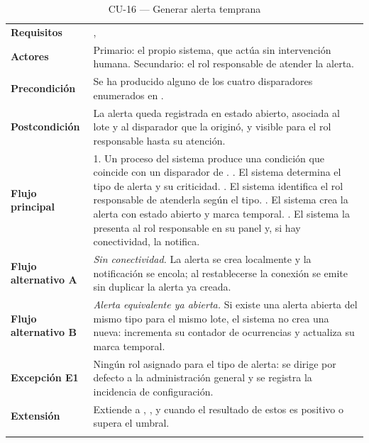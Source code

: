 \begin{longtable}{|L{3.4cm}|L{12.0cm}|}
\hline
{}\\
\hline
\textbf{Requisitos} & ,  \\ \hline
\textbf{Actores} & Primario: el propio sistema, que actúa sin intervención humana. Secundario: el rol responsable de atender la alerta. \\ \hline
\textbf{Precondición} & Se ha producido alguno de los cuatro disparadores enumerados en . \\ \hline
\textbf{Postcondición} & La alerta queda registrada en estado abierto, asociada al lote y al disparador que la originó, y visible para el rol responsable hasta su atención. \\ \hline
\textbf{Flujo principal} & 1. Un proceso del sistema produce una condición que coincide con un disparador de . . El sistema determina el tipo de alerta y su criticidad. . El sistema identifica el rol responsable de atenderla según el tipo. . El sistema crea la alerta con estado abierto y marca temporal. . El sistema la presenta al rol responsable en su panel y, si hay conectividad, la notifica. \\ \hline
\textbf{Flujo alternativo A} & \emph{Sin conectividad.} La alerta se crea localmente y la notificación se encola; al restablecerse la conexión se emite sin duplicar la alerta ya creada. \\ \hline
\textbf{Flujo alternativo B} & \emph{Alerta equivalente ya abierta.} Si existe una alerta abierta del mismo tipo para el mismo lote, el sistema no crea una nueva: incrementa su contador de ocurrencias y actualiza su marca temporal. \\ \hline
\textbf{Excepción E1} & Ningún rol asignado para el tipo de alerta: se dirige por defecto a la administración general y se registra la incidencia de configuración. \\ \hline
\textbf{Extensión} & Extiende a , ,  y  cuando el resultado de estos es positivo o supera el umbral. \\ \hline
\caption{CU-16 --- Generar alerta temprana}
\end{longtable}

